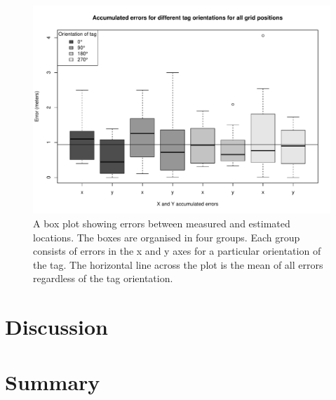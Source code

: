 \begin{figure}[H]
	\begin{center}
		\includegraphics[width=1\textwidth]{figures/error_boxplot}
		\caption{A box plot showing errors between measured and estimated locations. The boxes are organised in four groups. Each group consists of errors in the x and y axes for a particular orientation of the tag. The horizontal line across the plot is the mean of all errors regardless of the tag orientation.}
	\end{center}
\end{figure}

\section{Discussion}

\section{Summary}
